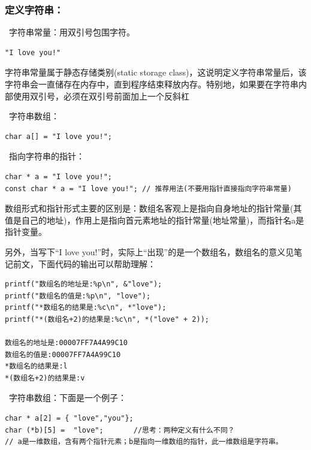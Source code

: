 \documentclass[zihao=-4,UTF8]{report}
\begin{document}
\subsubsection{定义字符串：}
\ 字符串常量：用双引号包围字符。\par
\begin{lstlisting}
"I love you!"
\end{lstlisting}
{\color{gray}\small 字符串常量属于静态存储类别(static storage class)，这说明定义字符串常量后，该字符串会一直储存在内存中，直到程序结束释放内存。特别地，如果要在字符串内部使用双引号，必须在双引号前面加上一个反斜杠}\par
{}\ 字符串数组：
\begin{lstlisting}
char a[] = "I love you!";
\end{lstlisting}
    \par
{}\ 指向字符串的指针：
\begin{lstlisting}
char * a = "I love you!";
const char * a = "I love you!"; // 推荐用法(不要用指针直接指向字符串常量)
\end{lstlisting}\par
{\color{gray}\small 数组形式和指针形式主要的区别是：数组名客观上是指向自身地址的指针常量(其值是自己的地址)，作用上是指向首元素地址的指针常量(地址常量)，而指针名a是指针变量。}\par
另外，当写下“I love you!”时，实际上“出现”的是一个数组名，数组名的意义见笔记前文，下面代码的输出可以帮助理解：
\begin{lstlisting}
printf("数组名的地址是:%p\n", &"love");
printf("数组名的值是:%p\n", "love");
printf("*数组名的结果是:%c\n", *"love");
printf("*(数组名+2)的结果是:%c\n", *("love" + 2));

数组名的地址是:00007FF7A4A99C10
数组名的值是:00007FF7A4A99C10
*数组名的结果是:l
*(数组名+2)的结果是:v
\end{lstlisting}
\par
{}\ 字符串数组：下面是一个例子：
\begin{lstlisting}
char * a[2] = { "love","you"};
char (*b)[5] =  "love";       //思考：两种定义有什么不同？
// a是一维数组，含有两个指针元素；b是指向一维数组的指针，此一维数组是字符串。
\end{lstlisting}
\end{document}
